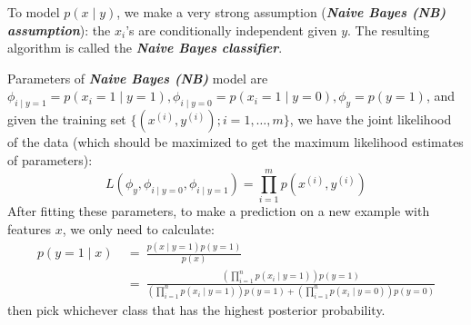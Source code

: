 \documentclass{article}
\begin{document}
\begin{spacing}{2}
\end{spacing}

To model $p(x\mid y)$, we make a very strong assumption (\emph{\textbf{Naive Bayes (NB) assumption}}): the $x_i$'s are conditionally independent given $y$. The resulting algorithm is called the \emph{\textbf{Naive Bayes classifier}}.

Parameters of \emph{\textbf{Naive Bayes (NB)}} model are $\phi_{i\mid y=1}=p(x_i=1\mid y=1), \phi_{i\mid y=0}=p(x_i=1\mid y=0), \phi_y=p(y=1)$, and given the training set $\{(x^{(i)},y^{(i)});i=1,\ldots,m\}$, we have the joint likelihood of the data (which should be maximized to get the maximum likelihood estimates of parameters):
\begin{equation*}
L(\phi_{y},\phi_{i\mid y=0},\phi_{i\mid y=1})=\prod_{i=1}^mp(x^{(i)},y^{(i)})
\end{equation*}
After fitting these parameters, to make a prediction on a new example with features $x$, we only need to calculate:
\begin{align*}
p(y=1\mid x)\ &=\ \frac{p(x\mid y=1)p(y=1)}{p(x)} \\
              &=\ \frac{\left(\prod\limits_{i=1}^np(x_i\mid y=1)\right)p(y=1)}{\left(\prod\limits_{i=1}^np(x_i\mid y=1)\right)p(y=1)+\left(\prod\limits_{i=1}^np(x_i\mid y=0)\right)p(y=0)}
\end{align*}
then pick whichever class that has the highest posterior probability.
\end{document}
